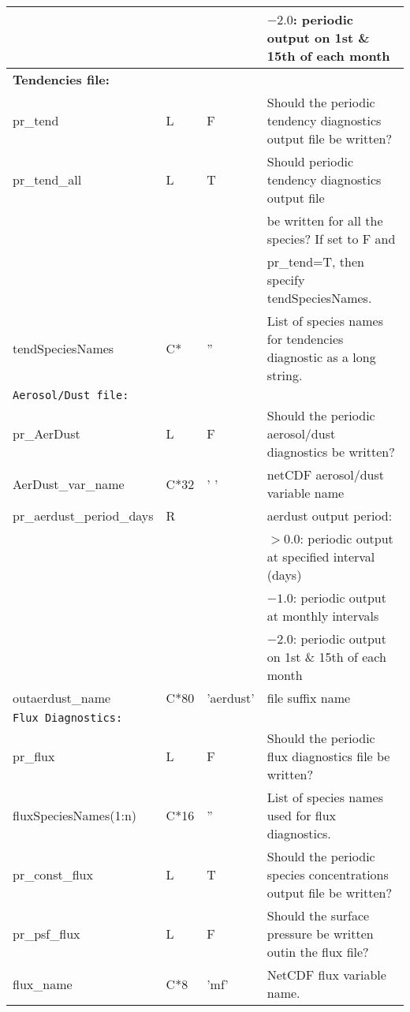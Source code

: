 {\begin{landscape}
\begin{center}
\begin{longtable}{|l|l|l|l|}
                          &   &      & $-2.0$:  periodic output on 1st \& 15th of each month  \\ \hline
\multicolumn{4}{|l|}{\bf Tendencies file: }  \\ \hline
pr\_tend          & L & F & Should the periodic tendency diagnostics output  file be written?  \\ \hline
pr\_tend\_all        & L & T & Should periodic tendency diagnostics output file  \\
                      &   &   & be written for all the species? If set to  F and  \\
                      &   &   & pr\_tend=T, then specify tendSpeciesNames.  \\ \hline
tendSpeciesNames & C* &  ''  & List of species names for tendencies diagnostic as a long string.  \\ \hline
\multicolumn{4}{|l|}{\tt Aerosol/Dust file:} \\ \hline
pr\_AerDust       & L & F & Should the periodic aerosol/dust diagnostics be written?  \\ \hline
AerDust\_var\_name &C*32& ' '    & netCDF aerosol/dust variable name  \\ \hline
pr\_aerdust\_period\_days & R &   & aerdust output period:  \\
                          &   &      & $>0.0$:  periodic output at specified interval (days)  \\
                          &   &      & $-1.0$:  periodic output at monthly intervals  \\
                          &   &      & $-2.0$:  periodic output on 1st \& 15th of each month  \\ \hline
outaerdust\_name   &C*80&'aerdust'& file suffix name \\ \hline
\multicolumn{4}{|l|}{\tt Flux Diagnostics:} \\ \hline
pr\_flux          & L & F & Should the periodic flux diagnostics file be written?  \\ \hline
fluxSpeciesNames(1:n)   & C*16 &   ''  & List of species names used for flux diagnostics.   \\ \hline
pr\_const\_flux   & L & T & Should the periodic species concentrations output file be written?  \\ \hline
 pr\_psf\_flux    & L & F & Should the surface pressure be written outin the flux file?  \\ \hline
flux\_name     &C*8& 'mf' & NetCDF flux variable name.  \\ \hline

\end{longtable}
\end{center}
\end{landscape}}
